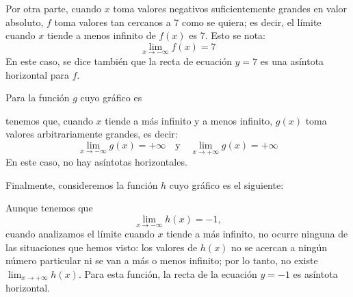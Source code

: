 \documentclass[../Teoría.root.tex]{subfiles}
\begin{document}
Por otra parte, cuando \(x\) toma valores negativos suficientemente grandes en valor absoluto, \(f\) toma valores tan cercanos a 7 como se quiera;
es decir, el límite cuando \(x\) tiende a menos infinito de \(f(x)\) es 7.
Esto se nota:
\[\lim_{x\to-\infty}f(x)=7\]
En este caso, se dice también que la recta de ecuación \(y=7\) es una asíntota horizontal para \(f\).

Para la función \(g\) cuyo gráfico es
\begin{center}
\end{center}
tenemos que, cuando \(x\) tiende a más infinito y a menos infinito, \(g(x)\) toma valores arbitrariamente grandes, es decir:
\[\lim_{x\to-\infty}g(x)=+\infty\quad\text{y}\quad\lim_{x\to+\infty}g(x)=+\infty\]
En este caso, no hay asíntotas horizontales.

Finalmente, consideremos la función \(h\) cuyo gráfico es el siguiente:
\begin{center}
\end{center}
Aunque tenemos que
\[\lim_{x\to-\infty}h(x)=-1,\]
cuando analizamos el límite cuando \(x\) tiende a más infinito, no ocurre ninguna de las situaciones que hemos visto:
los valores de \(h(x)\) no se acercan a ningún número particular ni se van a más o menos infinito;
por lo tanto, no existe \(\lim_{x\to+\infty}h(x)\).
Para esta función, la recta de la ecuación \(y=−1\) es asíntota horizontal.
\end{document}
